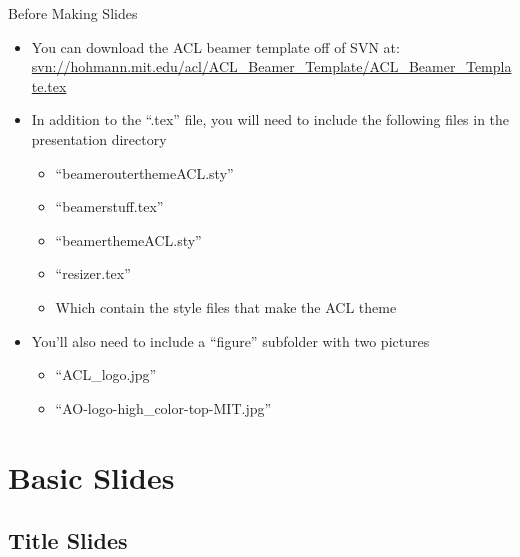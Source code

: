 \documentclass[11pt,mathserif]{beamer} %
\begin{document}
\begin{frame}[t]{Before Making Slides} %
	\begin{itemize} %
		\item You can download the ACL beamer template off of SVN at:
		\url{svn://hohmann.mit.edu/acl/ACL_Beamer_Template/ACL_Beamer_Template.tex}
\vspace{12pt}
		\item In addition to the ``.tex'' file, you will need to include the following files in the presentation directory
		\begin{itemize}
			\item ``beamerouterthemeACL.sty''
			\item ``beamerstuff.tex''
			\item ``beamerthemeACL.sty''
			\item ``resizer.tex''
			\item Which contain the style files that make the ACL theme
		\end{itemize}
\vspace{12pt}
		\item You'll also need to include a ``figure'' subfolder with two pictures
		\begin{itemize}
			\item ``ACL\_logo.jpg''
			\item ``AO-logo-high\_color-top-MIT.jpg''
		\end{itemize}
	\end{itemize}
\end{frame}


\section{Basic Slides}
\subsection{Title Slides} 
\end{document}
